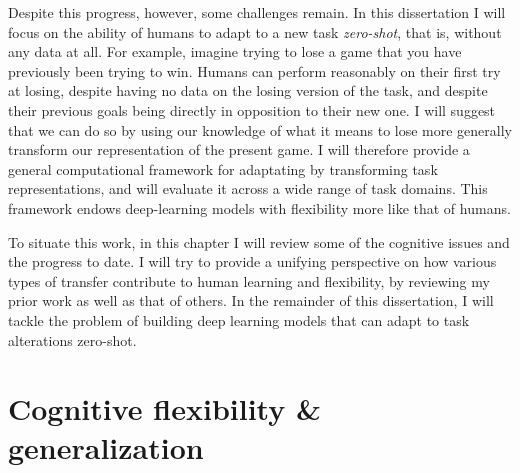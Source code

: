 Despite this progress, however, some challenges remain. In this dissertation I will focus on the ability of humans to adapt to a new task \emph{zero-shot}, that is, without any data at all. For example, imagine trying to lose a game that you have previously been trying to win. Humans can perform reasonably on their first try at losing, despite having no data on the losing version of the task, and despite their previous goals being directly in opposition to their new one. I will suggest that we can do so by using our knowledge of what it means to lose more generally transform our representation of the present game. I will therefore provide a general computational framework for adaptating by transforming task representations, and will evaluate it across a wide range of task domains. This framework endows deep-learning models with flexibility more like that of humans. \par 
To situate this work, in this chapter I will review some of the cognitive issues and the progress to date. I will try to provide a unifying perspective on how various types of transfer contribute to human learning and flexibility, by reviewing my prior work as well as that of others. In the remainder of this dissertation, I will tackle the problem of building deep learning models that can adapt to task alterations zero-shot. \par 

\section{Cognitive flexibility \& generalization}

